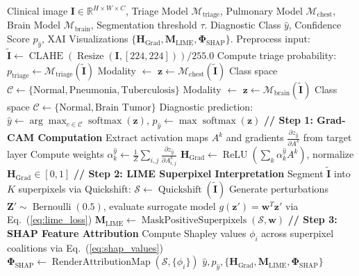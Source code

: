 \documentclass[journal]{IEEEtran}
\begin{document}
\begin{algorithm}[!t]
\caption{Multi-Organ Diagnostic Triage and Tri-Modal XAI Consensus Synthesis}
\label{alg:multi_organ_pipeline}
\begin{algorithmic}[1]
\REQUIRE Clinical image $\mathbf{I} \in \mathbb{R}^{H \times W \times C}$, Triage Model $\mathcal{M}_{\text{triage}}$, Pulmonary Model $\mathcal{M}_{\text{chest}}$, Brain Model $\mathcal{M}_{\text{brain}}$, Segmentation threshold $\tau$.
\ENSURE Diagnostic Class $\hat{y}$, Confidence Score $p_{\hat{y}}$, XAI Visualizations $\{\mathbf{H}_{\text{Grad}}, \mathbf{M}_{\text{LIME}}, \mathbf{\Phi}_{\text{SHAP}}\}$.
\STATE Preprocess input: $\tilde{\mathbf{I}} \leftarrow \operatorname{CLAHE}(\operatorname{Resize}(\mathbf{I}, [224, 224])) / 255.0$
\STATE Compute triage probability: $p_{\text{triage}} \leftarrow \mathcal{M}_{\text{triage}}(\tilde{\mathbf{I}})$
    \STATE Modality $\leftarrow$ 
    \STATE $\mathbf{z} \leftarrow \mathcal{M}_{\text{chest}}(\tilde{\mathbf{I}})$
    \STATE Class space $\mathcal{C} \leftarrow \{\text{Normal}, \text{Pneumonia}, \text{Tuberculosis}\}$
\ELSE
    \STATE Modality $\leftarrow$ 
    \STATE $\mathbf{z} \leftarrow \mathcal{M}_{\text{brain}}(\tilde{\mathbf{I}})$
    \STATE Class space $\mathcal{C} \leftarrow \{\text{Normal}, \text{Brain Tumor}\}$
\ENDIF
\STATE Diagnostic prediction: $\hat{y} \leftarrow \arg\max_{c \in \mathcal{C}} \operatorname{softmax}(\mathbf{z})$, $p_{\hat{y}} \leftarrow \max \operatorname{softmax}(\mathbf{z})$
\STATE \textbf{// Step 1: Grad-CAM Computation}
\STATE Extract activation maps $A^k$ and gradients $\frac{\partial z_{\hat{y}}}{\partial A^k}$ from target layer
\STATE Compute weights $\alpha_k^{\hat{y}} \leftarrow \frac{1}{Z}\sum_{i,j} \frac{\partial z_{\hat{y}}}{\partial A_{i,j}^k}$
\STATE $\mathbf{H}_{\text{Grad}} \leftarrow \operatorname{ReLU}\left(\sum_k \alpha_k^{\hat{y}} A^k\right)$, normalize $\mathbf{H}_{\text{Grad}} \in [0, 1]$
\STATE \textbf{// Step 2: LIME Superpixel Interpretation}
\STATE Segment $\tilde{\mathbf{I}}$ into $K$ superpixels via Quickshift: $\mathcal{S} \leftarrow \operatorname{Quickshift}(\tilde{\mathbf{I}})$
\STATE Generate perturbations $\mathbf{Z}' \sim \operatorname{Bernoulli}(0.5)$, evaluate surrogate model $g(\mathbf{z}') = \mathbf{w}^T \mathbf{z}'$ via Eq.~(\ref{eq:lime_loss})
\STATE $\mathbf{M}_{\text{LIME}} \leftarrow \operatorname{MaskPositiveSuperpixels}(\mathcal{S}, \mathbf{w})$
\STATE \textbf{// Step 3: SHAP Feature Attribution}
\STATE Compute Shapley values $\phi_i$ across superpixel coalitions via Eq.~(\ref{eq:shap_values})
\STATE $\mathbf{\Phi}_{\text{SHAP}} \leftarrow \operatorname{RenderAttributionMap}(\mathcal{S}, \{\phi_i\})$
\RETURN $\hat{y}, p_{\hat{y}}, \{\mathbf{H}_{\text{Grad}}, \mathbf{M}_{\text{LIME}}, \mathbf{\Phi}_{\text{SHAP}}\}$
\end{algorithmic}
\end{algorithm}
\end{document}
